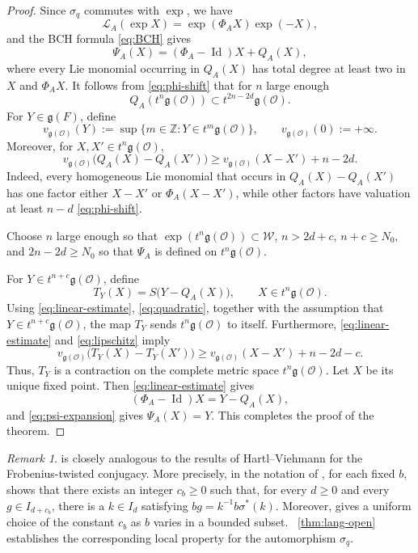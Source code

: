 \documentclass[11pt]{amsart}
\numberwithin{equation}{section}
\theoremstyle{definition}
\theoremstyle{remark}
\newtheorem{remark}[remark]{Remark}
\begin{document}
\begin{proof}
Since $\sigma_q$ commutes with $\exp$, we have
\[
  \mathcal{L}_A(\exp X)=\exp(\Phi_AX)\exp(-X),
\]
and the BCH formula \eqref{eq:BCH} gives
\begin{equation}\label{eq:psi-expansion}
  \Psi_A(X)=(\Phi_A-\operatorname{Id})X+Q_A(X),
\end{equation}
where every Lie monomial occurring in $Q_A(X)$ has total degree at least two in
$X$ and $\Phi_AX$. It follows from \eqref{eq:phi-shift} that for $n$ large enough
\begin{equation}\label{eq:quadratic}
  Q_A(t^n\mathfrak{g}(\mathcal{O}))\subset t^{2n-2d}\mathfrak{g}(\mathcal{O}).
\end{equation}
For $Y\in\mathfrak g(F)$, define 
\[
  v_{\mathfrak g(\mathcal O)}(Y)
  :=
  \sup\bigl\{
    m\in\mathbb Z:
    Y\in t^m\mathfrak g(\mathcal O)
  \bigr\},
  \qquad
  v_{\mathfrak g(\mathcal O)}(0):=+\infty.
\]
Moreover, for $X,X'\in t^n\mathfrak{g}(\mathcal{O})$,
\begin{equation}\label{eq:lipschitz}
  v_{\mathfrak{g}(\mathcal{O})}\bigl(Q_A(X)-Q_A(X')\bigr)
  \geq v_{\mathfrak{g}(\mathcal{O})}(X-X')+n-2d.
\end{equation}
Indeed, every homogeneous Lie monomial that occurs in $Q_A(X)-Q_A(X')$ has one factor either $X-X'$ or $\Phi_A(X-X')$, while other factors
have valuation at least $n-d$ \eqref{eq:phi-shift}.

Choose $n$ large enough so that $\exp(t^n\mathfrak{g}(\mathcal{O}))\subset\mathcal W$, $n>2d+c$, $ n+c\geq N_0,$ and $2n-2d\geq N_0$ so that $\Psi_A$ is defined on $t^n\mathfrak g(\mathcal O)$.


For $Y\in t^{n+c}\mathfrak{g}(\mathcal{O})$, define
\[
  T_Y(X)=S\bigl(Y-Q_A(X)\bigr),
  \qquad X\in t^n\mathfrak{g}(\mathcal{O}).
\]
Using \eqref{eq:linear-estimate}, \eqref{eq:quadratic}, together with the assumption that $Y\in t^{n+c}\mathfrak{g}(\mathcal{O})$, the map $T_Y$ sends $t^n\mathfrak{g}(\mathcal{O})$ to itself.
Furthermore, \eqref{eq:linear-estimate} and \eqref{eq:lipschitz} imply
\[
  v_{\mathfrak{g}(\mathcal{O})}\bigl(T_Y(X)-T_Y(X')\bigr)
  \geq v_{\mathfrak{g}(\mathcal{O})}(X-X')+n-2d-c.
\]
Thus, $T_Y$ is a contraction on the complete metric space
$t^n\mathfrak{g}(\mathcal{O})$. Let $X$ be its unique fixed point. Then \eqref{eq:linear-estimate} gives
\[
 (\Phi_A-\operatorname{Id})X=Y-Q_A(X),
\]
and \eqref{eq:psi-expansion} gives $\Psi_A(X)=Y$. This completes the proof of the theorem.
\end{proof}
\begin{remark}
 is closely analogous to the results of Hartl--Viehmann for the Frobenius-twisted conjugacy. More precisely, in the notation of \cite{HV}, for each fixed $b$, \cite[Lemma~10.2]{HV} shows that there exists an integer $c_b\geq0$ such that, for every $d\geq0$ and every $g\in I_{d+c_b}$, there is a $k\in I_d$ satisfying $bg=k^{-1}b\sigma^\ast(k).$ Moreover, \cite[Theorem~10.1]{HV} gives a uniform choice of the constant $c_b$ as $b$ varies in a bounded subset. ~\cref{thm:lang-open} establishes the corresponding local property for the automorphism $\sigma_q$.

\end{remark}
\end{document}
